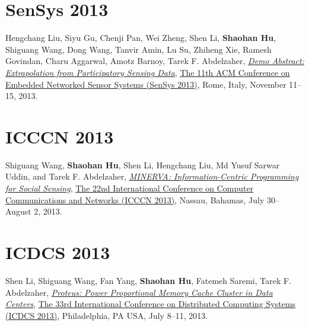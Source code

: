 \section{\sc SenSys 2013}\hypertarget{liu2013sensys}{}
Hengchang Liu, Siyu Gu, Chenji Pan, Wei Zheng, Shen Li, \textbf{Shaohan Hu}, Shiguang Wang, Dong Wang, Tanvir Amin, Lu Su, Zhiheng Xie, Ramesh Govindan, Charu Aggarwal, Amotz Barnoy, Tarek F. Abdelzaher,
\href{http://portal.acm.org/citation.cfm?id=2517431}{\emph{Demo Abstract: Extrapolation from Participatory Sensing Data}},
\href{http://sensys.acm.org/2013/}{\textsf{The 11th ACM Conference on Embedded Networked Sensor Systems (SenSys 2013)}},
Rome, Italy, November 11--15, 2013.


\section{\sc ICCCN 2013}\hypertarget{wang2013icccn}{}
Shiguang Wang, \textbf{Shaohan Hu}, Shen Li, Hengchang Liu, Md Yusuf Sarwar Uddin, and Tarek F. Abdelzaher,
\href{http://ieeexplore.ieee.org/xpls/abs_all.jsp?arnumber=6614152}{\emph{MINERVA: Information-Centric Programming for Social Sensing}},
\href{http://www.icccn.org/icccn13/}{\textsf{The 22nd International Conference on Computer Communications and Networks (ICCCN 2013)}},
Nassau, Bahamas, July 30--August 2, 2013.

\section{\sc ICDCS 2013}\hypertarget{li2013icdcs}{}
Shen Li, Shiguang Wang, Fan Yang, \textbf{Shaohan Hu}, Fatemeh Saremi, Tarek F. Abdelzaher,
\href{http://ieeexplore.ieee.org/xpl/articleDetails.jsp?arnumber=6681577}{\emph{Proteus: Power Proportional Memory Cache Cluster in Data Centers}},
\href{http://www.temple.edu/cis/icdcs2013/}{\textsf{The 33rd International Conference on Distributed Computing Systems (ICDCS 2013)}},
Philadelphia, PA USA, July 8--11, 2013.

